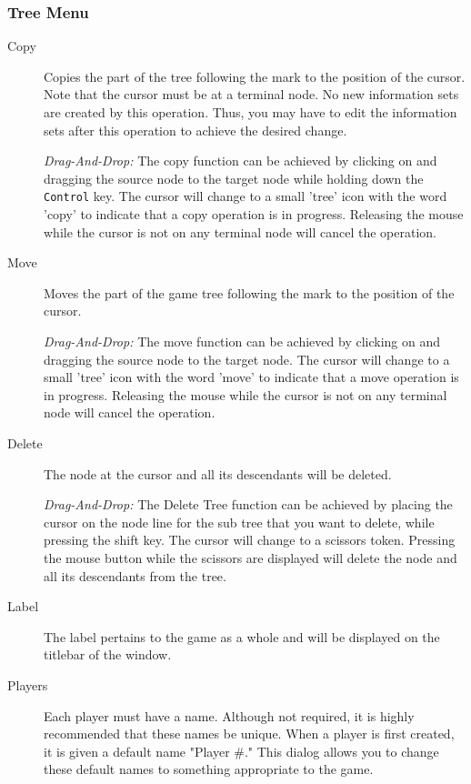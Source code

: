 \subsubsection{Tree Menu}
\begin{description}
\item[Copy] Copies the part of the tree following the mark to the 
position of the cursor.  Note that the cursor must be at a terminal node.  No 
new information sets are created by this operation.  Thus, you may have to edit the 
information sets after this operation to achieve the desired change. 

{\em Drag-And-Drop:} The copy function can be achieved by clicking on and
dragging the source node to the target node while holding down the {\tt Control}
 key.  The cursor will change to a small 'tree' icon with the word 'copy'
to indicate that a copy operation is in progress.  Releasing the mouse while
the cursor is not on any terminal node will cancel the operation.
\item[Move] Moves the part of the game tree following the mark to the position of 
the cursor.  

{\em Drag-And-Drop:} The move function can be achieved by clicking on and
dragging the source node to the target node. The cursor will change to a small
 'tree' icon with the word 'move'
to indicate that a move operation is in progress.  Releasing the mouse while
the cursor is not on any terminal node will cancel the operation.
\item[Delete]  The node at the cursor and all its descendants will be deleted.

{\em Drag-And-Drop:}  The Delete Tree function can be achieved by placing the cursor 
on the node line for the sub tree that you want to delete, while pressing the shift key.  
The cursor will change 
to a scissors token.  Pressing the mouse button while the scissors are displayed 
will delete the node and all its descendants from the tree. 
\item[Label]  The label pertains to the game as a whole and will be
displayed on the titlebar of the window.
\item[Players]  Each player must have a name.  Although not required, it
is highly recommended that these names be unique.  When a player is first
created, it is given a default name "Player \#."  This dialog allows you to
change these default names to something appropriate to the game.
\end{description}


